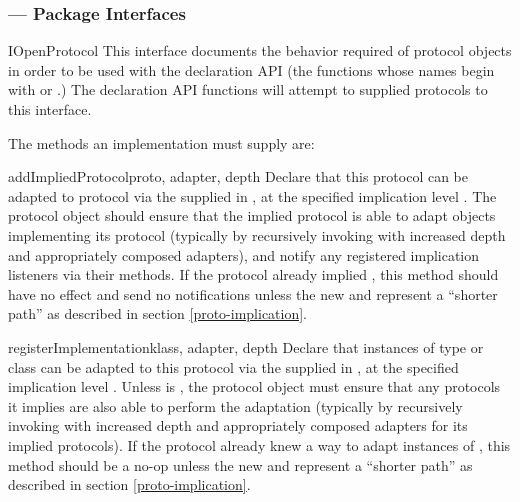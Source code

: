 \begin{verbatim%
}
\begin{verbatim%
}
\begin{verbatim%
}
\begin{verbatim%
}
\begin{verbatim%
}
\begin{verbatim%
}
\newpage
\subsubsection{ --- Package Interfaces\label{protocols-interfaces-module}}


\begin{classdesc*}{IOpenProtocol}
This interface documents the behavior required of protocol objects in order to
be used with the  declaration API (the functions whose names
begin with  or .)  The declaration API functions
will attempt to  supplied protocols to this interface.

The methods an  implementation must supply are:

\begin{methoddesc}{addImpliedProtocol}{proto, adapter, depth}
Declare that this protocol can be adapted to protocol  via the
 supplied in , at the specified implication
level .  The protocol object should ensure that the implied protocol
is able to adapt objects implementing its protocol (typically by recursively
invoking  with increased depth and
appropriately composed adapters), and notify any registered implication
listeners via their  methods.  If the protocol
already implied , this method should have no effect and send no
notifications unless the new  and  represent a
``shorter path'' as described in section \ref{proto-implication}.
\end{methoddesc}

\begin{methoddesc}{registerImplementation}{klass, adapter, depth}
Declare that instances of type or class  can be adapted to this
protocol via the  supplied in , at the
specified implication level .  Unless  is
, the protocol object must ensure that
any protocols it implies are also able to perform the adaptation (typically
by recursively invoking  with increased depth
and appropriately composed adapters for its implied protocols).  If the
protocol already knew a way to adapt instances of , this method
should be a no-op unless the new  and  represent a
``shorter path'' as described in section \ref{proto-implication}.
\end{methoddesc}


\end{classdesc*}
\end{verbatim%
}
\end{verbatim%
}
\end{verbatim%
}
\end{verbatim%
}
\end{verbatim%
}
\end{verbatim%
}
